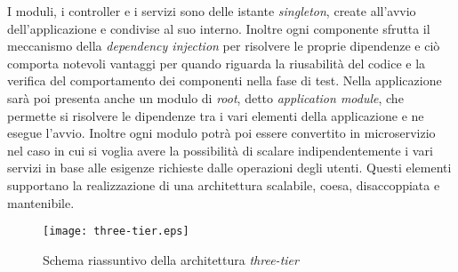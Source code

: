 I moduli, i controller e i servizi sono delle istante \textit{singleton}, create
all'avvio dell'applicazione e condivise al suo interno. Inoltre ogni componente sfrutta il meccanismo
della \textit{dependency injection} per risolvere le proprie dipendenze e ciò comporta
notevoli vantaggi per quando riguarda la riusabilità del codice e la verifica del comportamento dei componenti
nella fase di test.
Nella applicazione sarà poi presenta anche un modulo di \textit{root}, detto \textit{application module}, che
permette si risolvere le dipendenze tra i vari elementi della applicazione e ne esegue l'avvio.
Inoltre ogni modulo potrà poi essere convertito in microservizio nel caso in cui si voglia avere la possibilità di scalare
indipendentemente i vari servizi in base alle esigenze richieste dalle operazioni degli utenti.
Questi elementi supportano la realizzazione di una architettura scalabile, coesa, disaccoppiata e mantenibile.

\begin{figure}[H]
    \centering
    \texttt{[image: three-tier.eps]}
    \caption{Schema riassuntivo della architettura \textit{three-tier}}
    \label{fig:three-tier}
\end{figure}